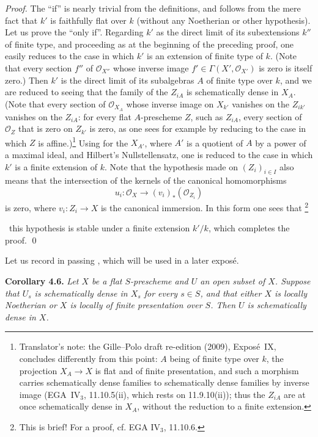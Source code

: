 \emph{Proof.}
The ``if'' is nearly trivial from the definitions, and follows from the
mere fact that \(k'\) is faithfully flat over \(k\) (without any
Noetherian or other hypothesis). Let us prove the ``only if''. Regarding
\(k'\) as the direct limit of its subextensions \(k''\) of finite type,
and proceeding as at the beginning of the preceding proof, one easily
reduces to the case in which \(k'\) is an extension of finite type of
\(k\). (Note that every section \(f''\) of \(\mathscr O_{X''}\) whose
inverse image \(f'\in\Gamma(X',\mathscr O_{X'})\) is zero is itself
zero.) Then \(k'\) is the direct limit of its subalgebras \(A\) of finite
type over \(k\), and we are reduced to seeing that the family of the
\(Z_{iA}\) is schematically dense in \(X_A\). (Note that every section of
\(\mathscr O_{X_A}\) whose inverse image on \(X_{k'}\) vanishes on the
\(Z_{ik'}\) vanishes on the \(Z_{iA}\): for every flat \(A\)-prescheme
\(Z\), such as \(Z_{iA}\), every section of \(\mathscr O_Z\) that is zero
on \(Z_{k'}\) is zero, as one sees for example by reducing to the case in
which \(Z\) is affine.)\footnote{Translator's note: the Gille--Polo draft
re-edition (2009), Expos\'e~IX, concludes differently from this point:
\(A\) being of finite type over \(k\), the projection \(X_A\to X\) is
flat and of finite presentation, and such a morphism carries
schematically dense families to schematically dense families by inverse
image (EGA~IV\(_3\), 11.10.5(ii), which rests on 11.9.10(ii)); thus the
\(Z_{iA}\) are at once schematically dense in \(X_A\), without the
reduction to a finite extension.} Using  for
the \(X_{A'}\), where \(A'\) is a quotient of \(A\) by a power of a
maximal ideal, and Hilbert's Nullstellensatz, one is reduced to the case
in which \(k'\) is a finite extension of \(k\). Note that the hypothesis
made on \((Z_i)_{i\in I}\) also means that the intersection of the
kernels of the canonical homomorphisms
\[
  u_i:\mathscr O_X\longrightarrow (v_i)_*(\mathscr O_{Z_i})
\]
is zero, where \(v_i:Z_i\to X\) is the canonical immersion. In this form
one sees that%
\begingroup
\renewcommand{\thefootnote}{\(\ast\)}%
\footnote{This is brief! For a proof, cf. EGA IV\(_3\), 11.10.6.}%
\addtocounter{footnote}{-1}%
\endgroup\ this hypothesis is stable under a finite extension \(k'/k\),
which completes the proof. \qed

Let us record in passing , which will be used in a
later expos\'e.%

\medskip
\noindent{}\textbf{Corollary 4.6.}
\textit{Let \(X\) be a flat \(S\)-prescheme and \(U\) an open subset of
\(X\). Suppose that \(U_s\) is schematically dense in \(X_s\) for every
\(s\in S\), and that either \(X\) is locally Noetherian or \(X\) is
locally of finite presentation over \(S\). Then \(U\) is schematically
dense in \(X\).}

